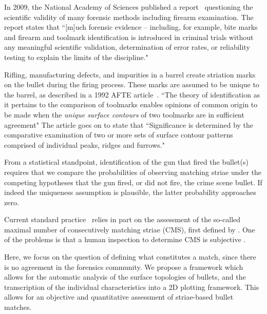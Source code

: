 \documentclass[aoas, preprint]{imsart}\usepackage[]{graphicx}\usepackage[]{color}
\newcommand{\hh}[1]{{\color{magenta} #1}}
\begin{document}
In 2009, the National Academy of Sciences published a report~\citep{NAS:2009} questioning the scientific validity of many forensic methods including firearm examination. The report states that ``[m]uch forensic evidence -- including, for example, bite marks and firearm and toolmark identification is introduced in criminal trials without any meaningful scientific validation, determination of error rates, or reliability testing to explain the limits of the discipline."

Rifling, manufacturing defects, and impurities in a barrel create striation marks on the bullet during the firing process. These marks are assumed to be unique to the barrel, as described in a 1992 AFTE article~\citep{afte:1992}. ``The theory of identification as it pertains to the comparison of toolmarks enables opinions of common origin to be made when the \emph{unique surface contours} of two toolmarks are in sufficient agreement" The article goes on to state that ``Significance is determined by the comparative examination of two or more sets of surface contour patterns comprised of individual peaks, ridges and furrows."

From a statistical standpoint, identification of the gun that fired the bullet(s) requires that we compare the probabilities of observing matching striae under the competing hypotheses that the gun fired, or did not fire, the crime scene bullet. If indeed the uniqueness assumption is plausible, the latter probability approaches zero.

Current standard practice~\cite{afte:1992} relies in part on the assessment of the so-called maximal number of consecutively matching striae (CMS), first defined by \citet{biasotti:1959}.
One of the problems is that a human inspection to determine CMS is subjective \citep{miller:1998}. 

Here, we focus on the question of defining what constitutes a match, since there is no agreement in the forensics community. We propose a framework which allows for the automatic analysis of the surface topologies of bullets, and the transcription of the individual characteristics into a 2D plotting framework. 
This allows for an objective and quantitative assessment of striae-based bullet matches.

\end{document}
